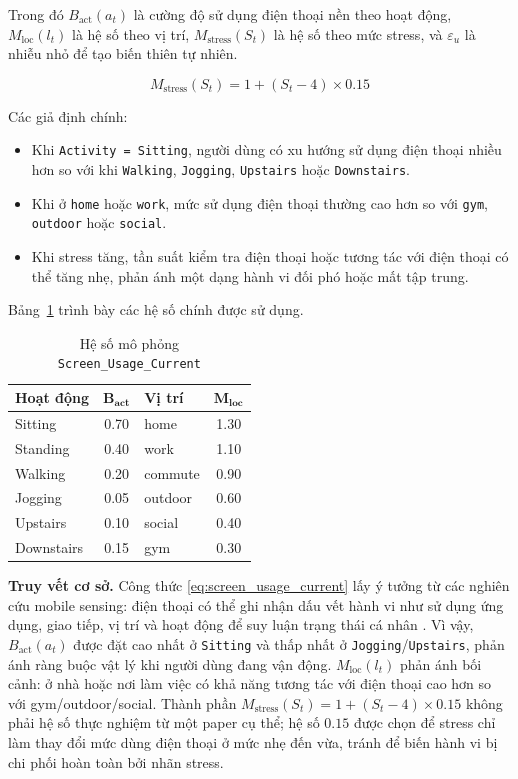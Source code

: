 Trong đó $B_{\text{act}}(a_t)$ là cường độ sử dụng điện thoại nền theo hoạt động, $M_{\text{loc}}(l_t)$ là hệ số theo vị trí, $M_{\text{stress}}(S_t)$ là hệ số theo mức stress, và $\varepsilon_u$ là nhiễu nhỏ để tạo biến thiên tự nhiên.

\begin{equation}
    M_{\text{stress}}(S_t) = 1 + (S_t - 4) \times 0.15
\end{equation}

Các giả định chính:
\begin{itemize}
    \item Khi \texttt{Activity = Sitting}, người dùng có xu hướng sử dụng điện thoại nhiều hơn so với khi \texttt{Walking}, \texttt{Jogging}, \texttt{Upstairs} hoặc \texttt{Downstairs}.
    \item Khi ở \texttt{home} hoặc \texttt{work}, mức sử dụng điện thoại thường cao hơn so với \texttt{gym}, \texttt{outdoor} hoặc \texttt{social}.
    \item Khi stress tăng, tần suất kiểm tra điện thoại hoặc tương tác với điện thoại có thể tăng nhẹ, phản ánh một dạng hành vi đối phó hoặc mất tập trung.
\end{itemize}

Bảng~\ref{tab:screen_usage_factors} trình bày các hệ số chính được sử dụng.

\begin{table}[H]
\centering
\caption{Hệ số mô phỏng \texttt{Screen\_Usage\_Current}}
\label{tab:screen_usage_factors}
\small
\begin{tabular}{|l|c|l|c|}
\hline
\textbf{Hoạt động} & $\boldsymbol{B_{\text{act}}}$ & \textbf{Vị trí} & $\boldsymbol{M_{\text{loc}}}$ \\
\hline
Sitting    & 0.70 & home    & 1.30 \\
Standing   & 0.40 & work    & 1.10 \\
Walking    & 0.20 & commute & 0.90 \\
Jogging    & 0.05 & outdoor & 0.60 \\
Upstairs   & 0.10 & social  & 0.40 \\
Downstairs & 0.15 & gym     & 0.30 \\
\hline
\end{tabular}
\end{table}

\textbf{Truy vết cơ sở.} Công thức \eqref{eq:screen_usage_current} lấy ý tưởng từ các nghiên cứu mobile sensing: điện thoại có thể ghi nhận dấu vết hành vi như sử dụng ứng dụng, giao tiếp, vị trí và hoạt động để suy luận trạng thái cá nhân \cite{lane2010survey, likamwa2013moodscope}. Vì vậy, $B_{\text{act}}(a_t)$ được đặt cao nhất ở \texttt{Sitting} và thấp nhất ở \texttt{Jogging}/\texttt{Upstairs}, phản ánh ràng buộc vật lý khi người dùng đang vận động. $M_{\text{loc}}(l_t)$ phản ánh bối cảnh: ở nhà hoặc nơi làm việc có khả năng tương tác với điện thoại cao hơn so với gym/outdoor/social. Thành phần $M_{\text{stress}}(S_t)=1+(S_t-4)\times0.15$ không phải hệ số thực nghiệm từ một paper cụ thể; hệ số $0.15$ được chọn để stress chỉ làm thay đổi mức dùng điện thoại ở mức nhẹ đến vừa, tránh để biến hành vi bị chi phối hoàn toàn bởi nhãn stress.

